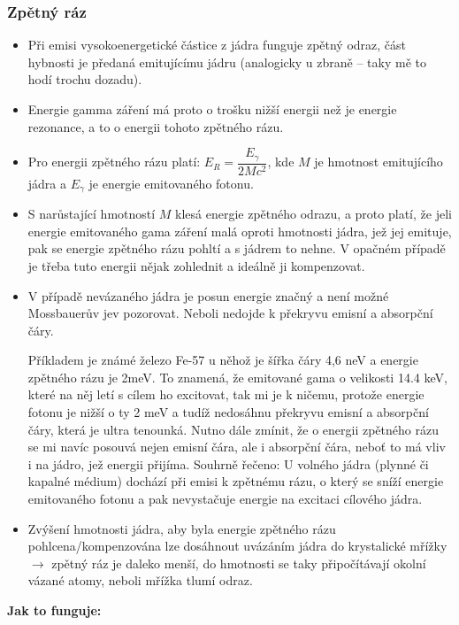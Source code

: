 \subsubsection{Zpětný ráz}
\begin{itemize}

\item Při emisi vysokoenergetické částice z jádra funguje zpětný odraz, část hybnosti je předaná emitujícímu jádru (analogicky u zbraně -- taky mě to hodí trochu dozadu).
\item Energie gamma záření má proto o trošku nižší energii než je energie rezonance, a to o energii tohoto zpětného rázu.
\item Pro energii zpětného rázu platí: $E_{R} = \dfrac{E_{\gamma}}{2 M c^2}$, kde $M$ je hmotnost emitujícího jádra a $E_{\gamma}$ je energie emitovaného fotonu.
\item S narůstající hmotností $M$ klesá energie zpětného odrazu, a proto platí, že jeli energie emitovaného gama záření malá oproti hmotnosti jádra, jež jej emituje, pak se energie zpětného rázu pohltí a s jádrem to nehne. V opačném případě je třeba tuto energii nějak zohlednit a ideálně ji kompenzovat.
\item V případě nevázaného jádra je posun energie značný a není možné Mossbauerův jev pozorovat. Neboli nedojde k překryvu emisní a absorpční čáry.

Příkladem je známé železo Fe-57 u něhož je šířka čáry 4,6 neV a energie zpětného rázu je 2meV. To znamená, že emitované gama o velikosti 14.4 keV, které na něj letí s cílem ho excitovat, tak mi je k ničemu, protože energie fotonu je nižší o ty 2 meV a tudíž nedosáhnu překryvu emisní a absorpční čáry, která je ultra tenounká. Nutno dále zmínit, že o energii zpětného rázu se mi navíc posouvá nejen emisní čára, ale i absorpční čára, neboť to má vliv i na jádro, jež energii přijíma. Souhrně řečeno: U volného jádra (plynné či kapalné médium) dochází při emisi k zpětnému rázu, o který se sníží energie emitovaného fotonu a pak nevystačuje energie na excitaci cílového jádra.

\item Zvýšení hmotnosti jádra, aby byla energie zpětného rázu pohlcena/kompenzována lze dosáhnout uvázáním jádra do krystalické mřížky $\rightarrow$ zpětný ráz je daleko menší, do hmotnosti se taky připočítávají okolní vázané atomy, neboli mřížka tlumí odraz.
\end{itemize}


\textbf{Jak to funguje:}

